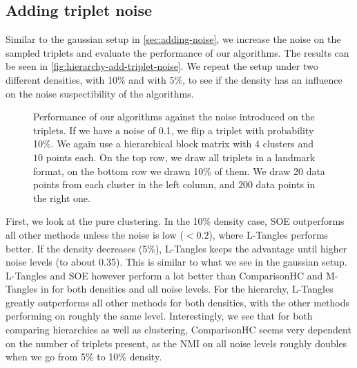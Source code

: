 \subsection{Adding triplet noise}\label{sec:h-triplet-noise}
Similar to the gaussian setup in \autoref{sec:adding-noise}, we increase the noise on the sampled triplets and evaluate the performance of our algorithms. The results
can be seen in \autoref{fig:hierarchy-add-triplet-noise}. We repeat the setup under two different densities, with 10\% and with 5\%, to see if the density has an influence
on the noise suspectibility of the algorithms.
\onecolumn
\begin{figure}[ht]
    \centering
    \hfill
    \caption{
        Performance of our algorithms against the noise introduced on the triplets. 
        If we have a noise of 0.1, we flip a triplet with probability 10\%.  
        We again use a hierarchical block matrix with $4$ clusters and $10$ points each. 
        On the top row, we draw all triplets in a landmark format, on the bottom row we drawn 10\% of them.    
        We draw $20$ data points from each cluster in the left column, and $200$ data points in the right one.
    }
    \label{fig:hierarchy-add-triplet-noise}
\end{figure}

First, we look at the pure clustering. In the 10\% density case, SOE outperforms all other methods unless the noise is
low ($<0.2$), where L-Tangles performs better. If the density decreases (5\%), L-Tangles keeps the 
advantage until higher noise levels (to about 0.35). 
This is similar to what we see in the gaussian setup.
L-Tangles and SOE however perform a lot better than ComparisonHC and M-Tangles in for both densities and all noise levels.  For the hierarchy, L-Tangles greatly outperforms all other methods for both densities,
with the other methods performing on roughly the same level. Interestingly, 
we see that for both comparing hierarchies as well as clustering, 
ComparisonHC seems very dependent on the number of triplets present, as the NMI on all noise levels
roughly doubles when we go from 5\% to 10\% density.

